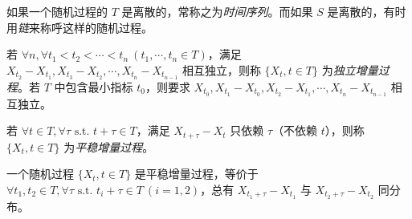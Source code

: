\documentclass[../main.tex]{subfiles}
\begin{document}
如果一个随机过程的 $T$ 是离散的，常称之为\emph{时间序列}。而如果 $S$ 是离散的，有时用\emph{链}来称呼这样的随机过程。

\begin{definition*}
    若 $\forall n,\forall t_1<t_2<\cdots<t_n\ (t_1,\cdots,t_n\in T)$，满足 $X_{t_2}-X_{t_1},X_{t_3}-X_{t_2},\cdots,X_{t_n}-X_{t_{n-1}}$ 相互独立，则称 $\{X_t,t\in T\}$ 为\emph{独立增量过程}。若 $T$ 中包含最小指标 $t_0$，则要求 $X_{t_0},X_{t_1}-X_{t_0},X_{t_2}-X_{t_1},\cdots,X_{t_n}-X_{t_{n-1}}$ 相互独立。
\end{definition*}

\begin{definition*}
    若 $\forall t\in T,\forall\tau\text{ s.t. }t+\tau\in T$，满足 $X_{t+\tau}-X_t$ 只依赖 $\tau$（不依赖 $t$），则称 $\{X_t,t\in T\}$ 为\emph{平稳增量过程}。
\end{definition*}

一个随机过程 $\{X_t,t\in T\}$ 是平稳增量过程，等价于 $\forall t_1,t_2\in T,\forall\tau\text{ s.t. }t_i+\tau\in T\ (i=1,2)$，总有 $X_{t_1+\tau}-X_{t_1}$ 与 $X_{t_2+\tau}-X_{t_2}$ 同分布。
\end{document}
